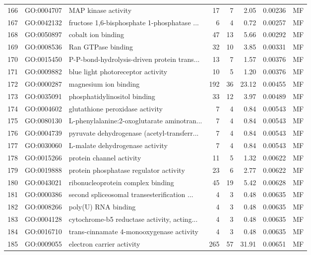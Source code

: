 \documentclass[12pt,oneside,a4paper]{article}
\begin{document}
\begin{longtable}{rllrrrll}
  166 & GO:0004707 & MAP kinase activity &  17 &   7 & 2.05 & 0.00236 & MF \\ 
  167 & GO:0042132 & fructose 1,6-bisphosphate 1-phosphatase ... &   6 &   4 & 0.72 & 0.00257 & MF \\ 
  168 & GO:0050897 & cobalt ion binding &  47 &  13 & 5.66 & 0.00292 & MF \\ 
  169 & GO:0008536 & Ran GTPase binding &  32 &  10 & 3.85 & 0.00331 & MF \\ 
  170 & GO:0015450 & P-P-bond-hydrolysis-driven protein trans... &  13 &   7 & 1.57 & 0.00376 & MF \\ 
  171 & GO:0009882 & blue light photoreceptor activity &  10 &   5 & 1.20 & 0.00376 & MF \\ 
  172 & GO:0000287 & magnesium ion binding & 192 &  36 & 23.12 & 0.00455 & MF \\ 
  173 & GO:0035091 & phosphatidylinositol binding &  33 &  12 & 3.97 & 0.00489 & MF \\ 
  174 & GO:0004602 & glutathione peroxidase activity &   7 &   4 & 0.84 & 0.00543 & MF \\ 
  175 & GO:0080130 & L-phenylalanine:2-oxoglutarate aminotran... &   7 &   4 & 0.84 & 0.00543 & MF \\ 
  176 & GO:0004739 & pyruvate dehydrogenase (acetyl-transferr... &   7 &   4 & 0.84 & 0.00543 & MF \\ 
  177 & GO:0030060 & L-malate dehydrogenase activity &   7 &   4 & 0.84 & 0.00543 & MF \\ 
  178 & GO:0015266 & protein channel activity &  11 &   5 & 1.32 & 0.00622 & MF \\ 
  179 & GO:0019888 & protein phosphatase regulator activity &  23 &   6 & 2.77 & 0.00622 & MF \\ 
  180 & GO:0043021 & ribonucleoprotein complex binding &  45 &  19 & 5.42 & 0.00628 & MF \\ 
  181 & GO:0000386 & second spliceosomal transesterification ... &   4 &   3 & 0.48 & 0.00635 & MF \\ 
  182 & GO:0008266 & poly(U) RNA binding &   4 &   3 & 0.48 & 0.00635 & MF \\ 
  183 & GO:0004128 & cytochrome-b5 reductase activity, acting... &   4 &   3 & 0.48 & 0.00635 & MF \\ 
  184 & GO:0016710 & trans-cinnamate 4-monooxygenase activity &   4 &   3 & 0.48 & 0.00635 & MF \\ 
  185 & GO:0009055 & electron carrier activity & 265 &  57 & 31.91 & 0.00651 & MF \\ 

\end{longtable}
\end{document}

